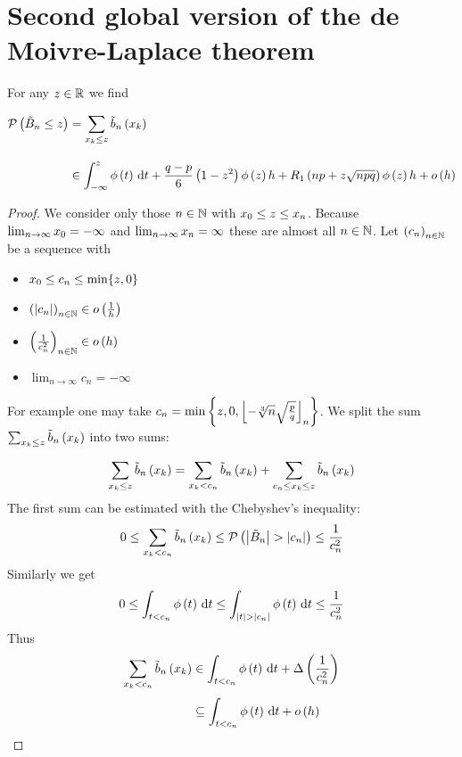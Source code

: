 \section{Second global version of the de Moivre-Laplace theorem}

\begin{theorem}
  For any $z\in\R$ we find

  \begin{align}
    \P{\BBs \le z} &= \sum_{\x \le z} \bb{\x} \bnl
    & \in \int_{-\infty}^z \fphi{t} \d{t} + \frac{q-p}6 \br{1-z^2}\fphi{z} h + \Ro{np+z\sqrt{npq}} \fphi{z} h + \littleo{h}
  \end{align}
\end{theorem}

\begin{proof}
  We consider only those $n\in\N$ with $\x[0] \le z \le \x[n]$. Because $\lim_{n\to\infty} \x[0] = -\infty$ and $\lim_{n\to\infty} \x[n] = \infty$ these are almost all $n\in\N$. Let $\seq{c_n}$ be a sequence with
  \begin{itemize}
    \item $\x[0] \le c_n \le \min\{z,0\}$
    \item $\seq{\abs{c_n}}\in\littleo{\frac 1h}$
    \item $\seq{\frac{1}{c_n^2}} \in \littleo{h}$
    \item $\lim_{n\to\infty} c_n=-\infty$
  \end{itemize}
  For example one may take $c_n = \min\left\{z, 0, \xdown{- \sqrt[3]{n}\sqrt{\frac pq}}\right\}$. We split the sum $\sum_{\x \le z} \bb{\x}$ into two sums:

  \begin{align}
    \sum_{\x \le z} \bb{\x} = \sum_{\x < c_n} \bb{\x} + \sum_{c_n \le \x \le z} \bb{\x}
  \end{align}
  The first sum can be estimated with the Chebyshev's inequality:
  \begin{align}
    0 \le \sum_{\x < c_n} \bb{\x} \le \P{\abs{\BBs} > \abs{c_n}} \le \frac{1}{c_n^2}
  \end{align}
  Similarly we get
  \begin{align}
    0 \le \int_{t < c_n} \fphi{t}\d{t} \le \int_{\abs{t} > \abs{c_n}} \fphi{t} \d{t} \le \frac{1}{c_n^2}
  \end{align}
  Thus
  \begin{align}
    \sum_{\x < c_n} \bb{\x} & \in \int_{t < c_n} \fphi{t}\d{t} + \bigabs{\frac{1}{c_n^2}} \nl
    & \subseteq \int_{t < c_n} \fphi{t}\d{t} + \littleo{h}
  \end{align}


\end{proof}
